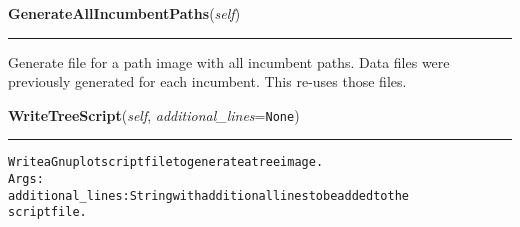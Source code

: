     \vspace{0.5ex}

\hspace{.8\funcindent}\begin{boxedminipage}{\funcwidth}

    \raggedright \textbf{GenerateAllIncumbentPaths}(\textit{self})

    \vspace{-1.5ex}

    \rule{\textwidth}{0.5\fboxrule}
\setlength{\parskip}{2ex}
    Generate file for a path image with all incumbent paths. Data files 
    were previously generated for each incumbent.  This re-uses those 
    files.

\setlength{\parskip}{1ex}
    \end{boxedminipage}

    \label{coinor:grumpy:BB:BBTree:WriteTreeScript}

    \vspace{0.5ex}

\hspace{.8\funcindent}\begin{boxedminipage}{\funcwidth}

    \raggedright \textbf{WriteTreeScript}(\textit{self}, \textit{additional\_lines}={\tt None})

    \vspace{-1.5ex}

    \rule{\textwidth}{0.5\fboxrule}
\setlength{\parskip}{2ex}
\begin{alltt}

Write a Gnuplot script file to generate a tree image.
Args:
  additional\_lines: String with additional lines to be added to the
    script file.
\end{alltt}

\setlength{\parskip}{1ex}
    \end{boxedminipage}

    \label{coinor:grumpy:BB:BBTree:GetTreeFixedHorizontalPositions}

    \vspace{0.5ex}

